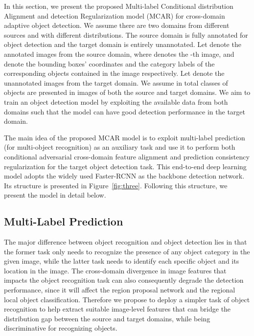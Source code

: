 \documentclass[runningheads]{llncs}
\begin{document}
In this section, we present the proposed Multi-label Conditional distribution
Alignment and detection Regularization model (MCAR) for cross-domain adaptive object detection.
We assume there are two domains from different sources and with different distributions.
The source domain is fully annotated for object detection and the target domain is entirely unannotated.
Let  denote the annotated images from the source domain,
where  denotes the -th image,  and  denote the bounding boxes' coordinates
and the category labels of the corresponding objects contained in the image respectively.
Let  denote the unannotated images from the target domain.
We assume in total  classes of objects are presented in images of both the source and target domains.
We aim to train an object detection model by exploiting the available data from both domains 
such that the model can have good detection performance in the target domain.



The main idea of the proposed MCAR model is to exploit multi-label prediction (for multi-object recognition)
as an auxiliary task and use it to perform both conditional adversarial cross-domain
feature alignment and prediction consistency regularization for the target object detection task.
This end-to-end deep learning model adopts the widely used Faster-RCNN as the backbone detection network. 
Its structure is presented in Figure~\ref{fig:three}. 
Following this structure, we present the model in detail below. 


\subsection{Multi-Label Prediction}\label{3.1}

The major difference between object recognition and object detection lies in that
the former task only needs to recognize the presence of any object category in the given image,
while the latter task needs to identify each specific object and its location in the image.
The cross-domain divergence in image features that impacts the object recognition
task can also consequently degrade the detection performance, 
since it will affect the region proposal network and the regional local object classification.
Therefore we propose to deploy a simpler task of object recognition to 
help extract suitable image-level features that 
can bridge the distribution gap between the source and target domains,
while being discriminative for recognizing objects. 
\end{document}
